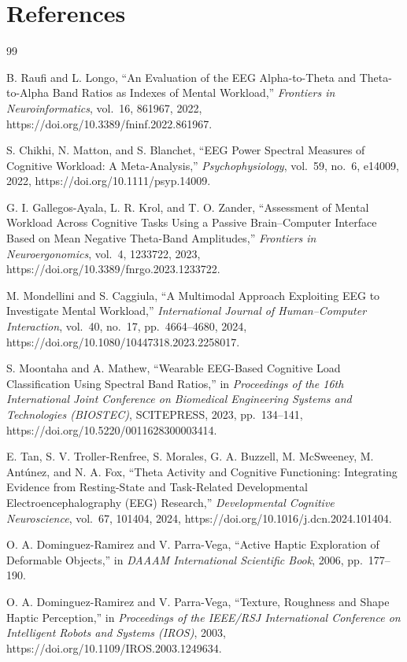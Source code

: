 \documentclass[10pt]{iopart}
\begin{document}
\section*{References}

\begin{thebibliography}{99}
\footnotesize

B. Raufi and L. Longo, ``An Evaluation of the EEG Alpha-to-Theta
and Theta-to-Alpha Band Ratios as Indexes of Mental Workload,''
\textit{Frontiers in Neuroinformatics}, vol.~16, 861967, 2022,
https://doi.org/10.3389/fninf.2022.861967.

S. Chikhi, N. Matton, and S. Blanchet, ``EEG Power Spectral Measures
of Cognitive Workload: A Meta-Analysis,''
\textit{Psychophysiology}, vol.~59, no.~6, e14009, 2022,
https://doi.org/10.1111/psyp.14009.

G. I. Gallegos-Ayala, L. R. Krol, and T. O. Zander,
``Assessment of Mental Workload Across Cognitive Tasks Using a
Passive Brain--Computer Interface Based on Mean Negative
Theta-Band Amplitudes,''
\textit{Frontiers in Neuroergonomics}, vol.~4, 1233722, 2023,
https://doi.org/10.3389/fnrgo.2023.1233722.

M. Mondellini and S. Caggiula, ``A Multimodal Approach Exploiting EEG
to Investigate Mental Workload,''
\textit{International Journal of Human--Computer Interaction}, vol.~40,
no.~17, pp.~4664--4680, 2024,
https://doi.org/10.1080/10447318.2023.2258017.

S. Moontaha and A. Mathew, ``Wearable EEG-Based Cognitive Load
Classification Using Spectral Band Ratios,''
in \textit{Proceedings of the 16th International Joint Conference on
Biomedical Engineering Systems and Technologies (BIOSTEC)},
SCITEPRESS, 2023, pp.~134--141,
https://doi.org/10.5220/0011628300003414.

E. Tan, S. V. Troller-Renfree, S. Morales, G. A. Buzzell,
M. McSweeney, M. Ant\'{u}nez, and N. A. Fox,
``Theta Activity and Cognitive Functioning: Integrating Evidence
from Resting-State and Task-Related Developmental
Electroencephalography (EEG) Research,''
\textit{Developmental Cognitive Neuroscience}, vol.~67, 101404, 2024,
https://doi.org/10.1016/j.dcn.2024.101404.

O. A. Dominguez-Ramirez and V. Parra-Vega, ``Active Haptic Exploration
of Deformable Objects,''
in \textit{DAAAM International Scientific Book}, 2006, pp.~177--190.

O. A. Dominguez-Ramirez and V. Parra-Vega, ``Texture, Roughness and
Shape Haptic Perception,''
in \textit{Proceedings of the IEEE/RSJ International Conference on
Intelligent Robots and Systems (IROS)}, 2003,
https://doi.org/10.1109/IROS.2003.1249634.


\end{thebibliography}
\end{document}
